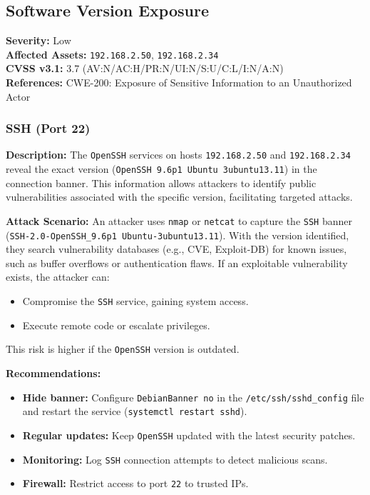\documentclass[a4paper,12pt]{article}
\begin{document}
\clearpage

\subsection{Software Version Exposure}
\textbf{Severity:} \textcolor{NavyBlue}{Low} \\
\textbf{Affected Assets:} \texttt{192.168.2.50}, \texttt{192.168.2.34} \\
\textbf{CVSS v3.1:} 3.7 (AV:N/AC:H/PR:N/UI:N/S:U/C:L/I:N/A:N) \\
\textbf{References:} CWE-200: Exposure of Sensitive Information to an Unauthorized Actor

\subsubsection{SSH (Port 22)}
\textbf{Description:}  
The \texttt{OpenSSH} services on hosts \texttt{192.168.2.50} and \texttt{192.168.2.34} reveal the exact version (\texttt{OpenSSH 9.6p1 Ubuntu 3ubuntu13.11}) in the connection banner. This information allows attackers to identify public vulnerabilities associated with the specific version, facilitating targeted attacks.

\textbf{Attack Scenario:}  
An attacker uses \texttt{nmap} or \texttt{netcat} to capture the \texttt{SSH} banner (\texttt{SSH-2.0-OpenSSH\_9.6p1 Ubuntu-3ubuntu13.11}). With the version identified, they search vulnerability databases (e.g., CVE, Exploit-DB) for known issues, such as buffer overflows or authentication flaws. If an exploitable vulnerability exists, the attacker can:
\begin{itemize}
    \item Compromise the \texttt{SSH} service, gaining system access.
    \item Execute remote code or escalate privileges.
\end{itemize}
This risk is higher if the \texttt{OpenSSH} version is outdated.

\textbf{Recommendations:}  
\begin{itemize}
    \item \textbf{Hide banner:} Configure \texttt{DebianBanner no} in the \texttt{/etc/ssh/sshd\_config} file and restart the service (\texttt{systemctl restart sshd}).
    \item \textbf{Regular updates:} Keep \texttt{OpenSSH} updated with the latest security patches.
    \item \textbf{Monitoring:} Log \texttt{SSH} connection attempts to detect malicious scans.
    \item \textbf{Firewall:} Restrict access to port \texttt{22} to trusted IPs.
\end{itemize}
\end{document}
